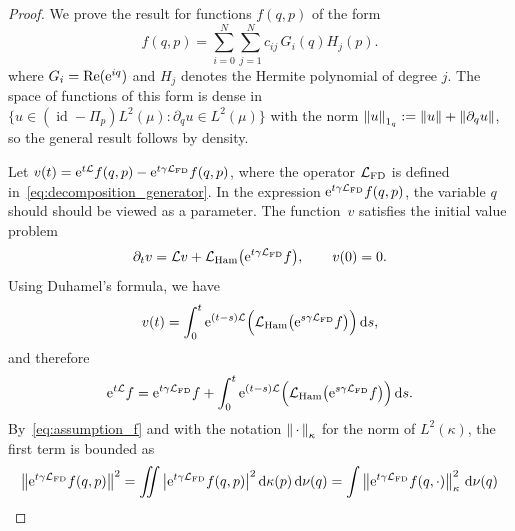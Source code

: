 \documentclass[11pt,a4paper]{article}
\DeclareMathOperator{\id}{id}
\newcommand{\e}{\mathrm{e}}
\newcommand{\dummy}{\,\cdot\,}
\renewcommand{\d}{\mathrm d}
\theoremstyle{plain}
\numberwithin{equation}{section}
\begin{document}
\begin{proof}
    We prove the result for functions $f(q, p)$ of the form
    \begin{equation}
        \label{eq:expansion}
        f(q, p) = \sum_{i=0}^{N} \sum_{j=1}^{N} c_{ij} \, G_i(q) H_j(p).
    \end{equation}
    where $G_i = {\rm Re}(\e^{iq})$ and $H_j$ denotes the Hermite polynomial of degree $j$.
    The space of functions of this form is dense in $\bigl\{u \in (\id - \Pi_p) L^2(\mu): \partial_q u \in L^2(\mu) \bigr\}$
    with the norm $\norm{u}_{1_q} := \norm{u} + \norm{\partial_q u}$,
    so the general result follows by density.

    Let $v(t) = \e^{t \mathcal L} f(q, p) - \e^{t \gamma \mathcal L_{\rm FD}} f(q, p)$,
    where the operator $\mathcal L_{\rm FD}$ is defined in~\eqref{eq:decomposition_generator}.
    In the expression $\e^{t \gamma \mathcal L_{\rm FD}} f(q, p)$,
    the variable $q$ should should be viewed as a parameter.
    The function~$v$ satisfies the initial value problem
    \[
        \partial_t v = \mathcal L v +  \mathcal L_{\rm Ham} \bigl(\e^{t \gamma \mathcal L_{\rm FD}} f\bigr), \qquad v(0) = 0.
    \]
    Using Duhamel's formula, we have
    \[
        v(t) = \int_{0}^{t} \e^{(t-s) \mathcal L}  \Bigl( \mathcal L_{\rm Ham} \bigl(\e^{s \gamma \mathcal L_{\rm FD}} f\bigr) \Bigr) \, \d s,
    \]
    and therefore
    \begin{equation}
        \label{eq:intermediate_decay_correlation}
        \e^{t \mathcal L} f =  \e^{t \gamma \mathcal L_{\rm FD}} f
        + \int_{0}^{t} \e^{(t-s) \mathcal L}  \Bigl( \mathcal L_{\rm Ham} \bigl(\e^{s \gamma \mathcal L_{\rm FD}} f\bigr) \Bigr) \, \d s.
    \end{equation}
    By~\eqref{eq:assumption_f} and with the notation $\norm{\dummy}[\kappa]$ for the norm of $L^2(\kappa)$,
    the first term is bounded as
    \begin{align}
        \notag
        \norm{\e^{t \gamma \mathcal L_{\rm FD}} f(q, p)}^2
        &= \int \!\!\!\! \int  \abs{\e^{t \gamma \mathcal L_{\rm FD}} f(q, p) }^2 \d \kappa(p) \,\d \nu(q)
        = \int \norm{\e^{t \gamma \mathcal L_{\rm FD}} f(q, \cdot) }[\kappa]^2 \, \d \nu(q) \\

\end{align}
\end{proof}
\end{document}
